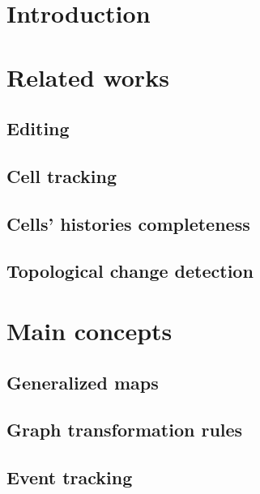 \documentclass[authoryear,preprint,review,12pt,x11names]{elsarticle}
\begin{document}

\section{Introduction}%
\label{sec:introduction}

\section{Related works}%
\label{sec:related-works}

\subsection{Editing}%
\label{sec:editing}

\subsection{Cell tracking}%
\label{sec:cell-tracking}

\subsection{Cells' histories completeness}%
\label{sec:history-completeness}

\subsection{Topological change detection}%
\label{sec:topol-change-detect}

\section{Main concepts}%
\label{sec:main-concepts}

\subsection{Generalized maps}%
\label{sec:generalized-maps}

\subsection{Graph transformation rules}%
\label{sec:graph-transf-rules}

\subsection{Event tracking}%
\label{sec:event-tracking}
\end{document}

